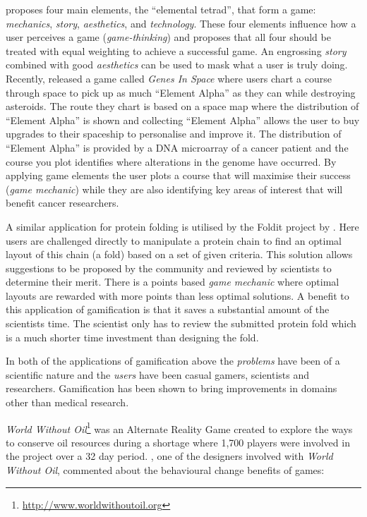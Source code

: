 \citet{artOfGameDesign} proposes four main elements, the ``elemental
tetrad'', that form a game: \emph{mechanics}, \emph{story},
\emph{aesthetics}, and \emph{technology}. These four elements influence
how a user perceives a game (\emph{game-thinking}) and
\citeauthor{artOfGameDesign} proposes that all four should be treated with
equal weighting to achieve a successful game. An engrossing
\emph{story} combined with good \emph{aesthetics} can be used to mask
what a user is truly doing. Recently, \citet{genesInSpace}
released a game called \emph{Genes In Space} where users chart a
course through space to pick up as much ``Element Alpha'' as they can
while destroying asteroids. The route they chart is based on a space
map where the distribution of ``Element Alpha'' is shown and
collecting ``Element Alpha'' allows the user to buy upgrades to their
spaceship to personalise and improve it. The distribution of ``Element
Alpha'' is provided by a DNA microarray of a cancer patient and the 
course you plot identifies where alterations in the genome have
occurred. By applying game elements the user plots a course that will
maximise their success (\emph{game mechanic}) while they are also
identifying key areas of interest that will benefit cancer
researchers. 

A similar application for protein folding is utilised by the Foldit
project by \citet{foldit}. Here users are challenged directly to
manipulate a protein chain to find an optimal layout of this chain (a
fold) based on a set of given criteria. This solution allows
suggestions to be proposed by the community and reviewed by scientists
to determine their merit. There is a points based \emph{game mechanic}
where optimal layouts are rewarded with more points than less optimal
solutions. A benefit to this application of gamification is that it
saves a substantial amount of the scientists time. The scientist only
has to review the submitted protein fold which is a much shorter time
investment than designing the fold.

In both of the applications of gamification above the \emph{problems}
have been of a scientific nature and the \emph{users} have been casual
gamers, scientists and researchers. Gamification has been shown to
bring improvements in domains other than medical research.

\emph{World Without
  Oil}\footnote{\url{http://www.worldwithoutoil.org}} was an Alternate
Reality Game created to explore the ways to conserve oil resources
during a shortage where 1,700 players were involved in the project
over a 32 day period. \citet{reality_broken}, one of the designers
involved with \emph{World Without Oil}, commented about the
behavioural change benefits of games:

